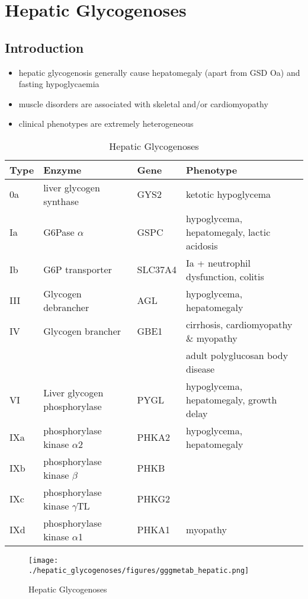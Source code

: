 \documentclass{scrartcl}
\begin{document}
\section{Hepatic Glycogenoses}
\label{sec:orgc24c64f}
\subsection{Introduction}
\label{sec:org6eefcfd}
\begin{itemize}
\item hepatic glycogenosis generally cause hepatomegaly (apart from GSD
Oa) and fasting hypoglycaemia
\item muscle disorders are associated with skeletal and/or
cardiomyopathy
\item clinical phenotypes are extremely heterogeneous
\end{itemize}
\begin{table}[htbp]
\caption{\label{tab:orgc8f98b3}
Hepatic Glycogenoses}
\centering
\begin{tabular}{llll}
Type & Enzyme & Gene & Phenotype\\
\hline
0a & liver glycogen synthase & GYS2 & ketotic hypoglycema\\
Ia & G6Pase \(\alpha\) & GSPC & hypoglycema, hepatomegaly, lactic acidosis\\
Ib & G6P transporter & SLC37A4 & Ia + neutrophil dysfunction, colitis\\
III & Glycogen debrancher & AGL & hypoglycema, hepatomegaly\\
IV & Glycogen brancher & GBE1 & cirrhosis, cardiomyopathy \& myopathy\\
 &  &  & adult polyglucosan body disease\\
VI & Liver glycogen phosphorylase & PYGL & hypoglycema, hepatomegaly, growth delay\\
IXa & phosphorylase kinase \(\alpha\)2 & PHKA2 & hypoglycema, hepatomegaly\\
IXb & phosphorylase kinase \(\beta\) & PHKB & \\
IXc & phosphorylase kinase \(\gamma\)TL & PHKG2 & \\
IXd & phosphorylase kinase \(\alpha\)1 & PHKA1 & myopathy\\
\end{tabular}
\end{table}

\begin{figure}[htbp]
\centering
\texttt{[image: ./hepatic\_glycogenoses/figures/gggmetab\_hepatic.png]}
\caption[Hepatic Glycogenoses]{\label{fig:org380a33f}
Hepatic Glycogenoses}
\end{figure}
\end{document}
